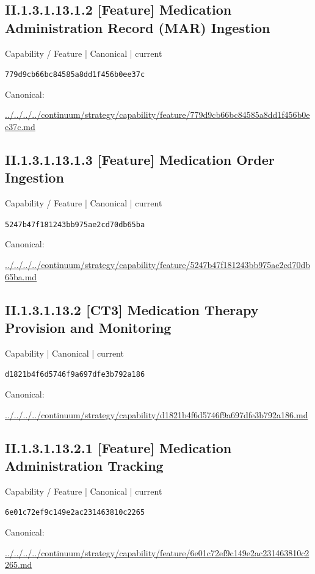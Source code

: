 \documentclass[10pt,a4paper]{article}
\begin{document}
\subsection*{II.1.3.1.13.1.2 [Feature] Medication Administration Record (MAR) Ingestion}
{\small Capability / Feature | Canonical | current}\par
\texttt{779d9cb66bc84585a8dd1f456b0ee37c}\par
Canonical: \par
{\footnotesize\url{../../../../continuum/strategy/capability/feature/779d9cb66bc84585a8dd1f456b0ee37c.md}}\par
\subsection*{II.1.3.1.13.1.3 [Feature] Medication Order Ingestion}
{\small Capability / Feature | Canonical | current}\par
\texttt{5247b47f181243bb975ae2cd70db65ba}\par
Canonical: \par
{\footnotesize\url{../../../../continuum/strategy/capability/feature/5247b47f181243bb975ae2cd70db65ba.md}}\par
\subsection*{II.1.3.1.13.2 [CT3] Medication Therapy Provision and Monitoring}
{\small Capability | Canonical | current}\par
\texttt{d1821b4f6d5746f9a697dfe3b792a186}\par
Canonical: \par
{\footnotesize\url{../../../../continuum/strategy/capability/d1821b4f6d5746f9a697dfe3b792a186.md}}\par
\subsection*{II.1.3.1.13.2.1 [Feature] Medication Administration Tracking}
{\small Capability / Feature | Canonical | current}\par
\texttt{6e01c72ef9c149e2ac231463810c2265}\par
Canonical: \par
{\footnotesize\url{../../../../continuum/strategy/capability/feature/6e01c72ef9c149e2ac231463810c2265.md}}\par
\end{document}
